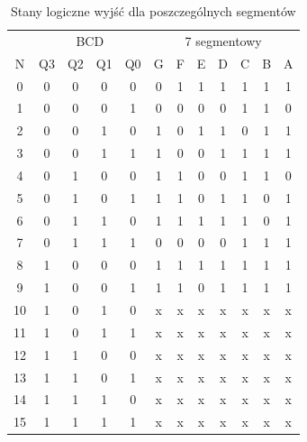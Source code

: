 \documentclass[a4paper,oneside]{report}
\begin{document}
\begin{table}[htbp] \centering
\begin{tabular}{|c|cccc|ccccccc|} 
\hline 
& \multicolumn{4}{c|}{BCD} & \multicolumn{7}{c|}{7 segmentowy} \\
N  & Q3   & Q2   & Q1   & Q0  & G   & F  & E  & D  & C  & B  & A  \\ \hline
0  & 0    & 0    & 0    & 0   & 0   & 1  & 1  & 1  & 1  & 1  & 1  \\
1  & 0    & 0    & 0    & 1   & 0   & 0  & 0  & 0  & 1  & 1  & 0  \\
2  & 0    & 0    & 1    & 0   & 1   & 0  & 1  & 1  & 0  & 1  & 1  \\
3  & 0    & 0    & 1    & 1   & 1   & 0  & 0  & 1  & 1  & 1  & 1  \\
4  & 0    & 1    & 0    & 0   & 1   & 1  & 0  & 0  & 1  & 1  & 0  \\
5  & 0    & 1    & 0    & 1   & 1   & 1  & 0  & 1  & 1  & 0  & 1  \\
6  & 0    & 1    & 1    & 0   & 1   & 1  & 1  & 1  & 1  & 0  & 1  \\
7  & 0    & 1    & 1    & 1   & 0   & 0  & 0  & 0  & 1  & 1  & 1  \\
8  & 1    & 0    & 0    & 0   & 1   & 1  & 1  & 1  & 1  & 1  & 1  \\
9  & 1    & 0    & 0    & 1   & 1   & 1  & 0  & 1  & 1  & 1  & 1  \\
10 & 1    & 0    & 1    & 0   & x   & x  & x  & x  & x  & x  & x  \\
11 & 1    & 0    & 1    & 1   & x   & x  & x  & x  & x  & x  & x  \\
12 & 1    & 1    & 0    & 0   & x   & x  & x  & x  & x  & x  & x  \\
13 & 1    & 1    & 0    & 1   & x   & x  & x  & x  & x  & x  & x  \\
14 & 1    & 1    & 1    & 0   & x   & x  & x  & x  & x  & x  & x  \\
15 & 1    & 1    & 1    & 1   & x   & x  & x  & x  & x  & x  & x  \\ \hline
\end{tabular}
\caption{Stany logiczne wyjść dla poszczególnych segmentów} 
\label{decoder_table} 
\end{table}
\end{document}

